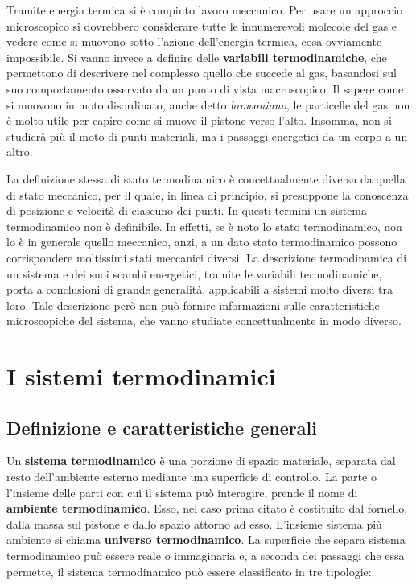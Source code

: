 \FloatBarrier
Tramite energia termica si è compiuto lavoro meccanico. Per usare un approccio microscopico si dovrebbero considerare tutte le innumerevoli molecole del gas e vedere come si muovono sotto l'azione dell'energia termica, cosa ovviamente impossibile. Si vanno invece a definire delle \textbf{variabili termodinamiche}, che permettono di descrivere nel complesso quello che succede al gas, basandosi sul suo comportamento osservato da un punto di vista macroscopico. Il sapere come si muovono in moto disordinato, anche detto \emph{browoniano}, le particelle del gas non è molto utile per capire come si muove il pistone verso l'alto. Insomma, non si studierà più il moto di punti materiali, ma i passaggi energetici da un corpo a un altro.

La definizione stessa di stato termodinamico è concettualmente diversa da quella di stato meccanico, per il quale, in linea di principio, si presuppone la conoscenza di posizione e velocità di ciascuno dei punti. In questi termini un sistema termodinamico non è definibile. In effetti, se è noto lo stato termodinamico, non lo è in generale quello meccanico, anzi, a un dato stato termodinamico possono corrispondere moltissimi stati meccanici diversi. La descrizione termodinamica di un sistema e dei suoi scambi energetici, tramite le variabili termodinamiche, porta a conclusioni di grande generalità, applicabili a sistemi molto diversi tra loro. Tale descrizione però non può fornire informazioni sulle caratteristiche microscopiche del sistema, che vanno studiate concettualmente in modo diverso.

\section{I sistemi termodinamici}

\subsection{Definizione e caratteristiche generali}

Un \textbf{sistema termodinamico} è una porzione di spazio materiale, separata dal resto dell'ambiente esterno mediante una superficie di controllo. La parte o l'insieme delle parti con cui il sistema può interagire, prende il nome di \textbf{ambiente termodinamico}. Esso, nel caso prima citato è costituito dal fornello, dalla massa sul pistone e dallo spazio attorno ad esso. L'insieme sistema più ambiente si chiama \textbf{universo termodinamico}. La superficie che separa sistema termodinamico può essere reale o immaginaria e, a seconda dei passaggi che essa permette, il sistema termodinamico può essere classificato in tre tipologie:

